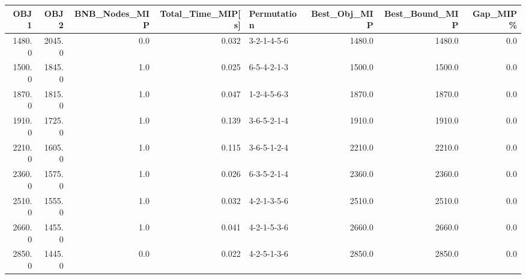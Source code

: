 \begin{tabular}{rrrrlrrr}
\toprule
   OBJ1 &    OBJ2 &  BNB\_Nodes\_MIP &  Total\_Time\_MIP[s] &  Permutation &  Best\_Obj\_MIP &  Best\_Bound\_MIP &  Gap\_MIP\% \\
\midrule
 1480.0 &  2045.0 &            0.0 &              0.032 &  3-2-1-4-5-6 &        1480.0 &          1480.0 &       0.0 \\
 1500.0 &  1845.0 &            1.0 &              0.025 &  6-5-4-2-1-3 &        1500.0 &          1500.0 &       0.0 \\
 1870.0 &  1815.0 &            1.0 &              0.047 &  1-2-4-5-6-3 &        1870.0 &          1870.0 &       0.0 \\
 1910.0 &  1725.0 &            1.0 &              0.139 &  3-6-5-2-1-4 &        1910.0 &          1910.0 &       0.0 \\
 2210.0 &  1605.0 &            1.0 &              0.115 &  3-6-5-1-2-4 &        2210.0 &          2210.0 &       0.0 \\
 2360.0 &  1575.0 &            1.0 &              0.026 &  6-3-5-2-1-4 &        2360.0 &          2360.0 &       0.0 \\
 2510.0 &  1555.0 &            1.0 &              0.032 &  4-2-1-3-5-6 &        2510.0 &          2510.0 &       0.0 \\
 2660.0 &  1455.0 &            1.0 &              0.041 &  4-2-1-5-3-6 &        2660.0 &          2660.0 &       0.0 \\
 2850.0 &  1445.0 &            0.0 &              0.022 &  4-2-5-1-3-6 &        2850.0 &          2850.0 &       0.0 \\
\bottomrule
\end{tabular}
